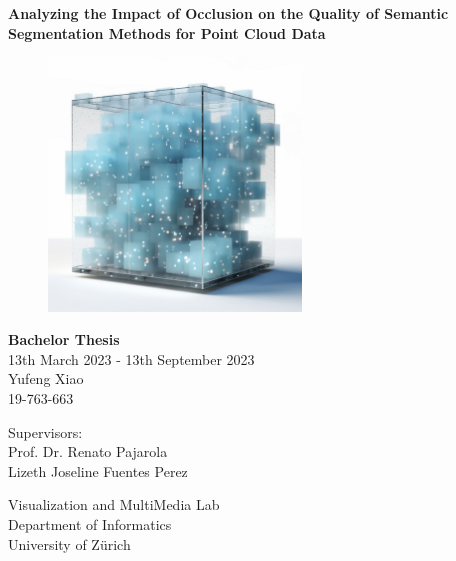 \documentclass[11pt, a4paper,oneside,chapterprefix=false]{scrbook}
\begin{document}
\frontmatter
\begin{titlepage}
	\setlength{\parindent}{0cm}
	\addtolength{\textheight}{1.0cm}

	\vspace{0.2cm}
	\Huge
	\begin{center}
		{\textsf{\textbf{Analyzing the Impact of Occlusion on the Quality of Semantic Segmentation Methods for Point Cloud Data}}}	
	\end{center}
	

	\vfill \vfill \vfill
	\begin{figure}[h]
		\centering
		\includegraphics*[width=0.6\textwidth]{figures/titleimage_yf.png}
	\end{figure}

	\vfill
	\sffamily\Large
	\begin{center}
		{\textbf{Bachelor Thesis}} \\ 
		13th March 2023 - 13th September 2023 \\[0.5cm]
		\large
		Yufeng Xiao \\ 19-763-663
	\end{center}

	\vfill \vfill \vfill
	\begin{minipage}[b]{0.5\textwidth} \raggedright
	Supervisors: \\
	Prof. Dr. Renato Pajarola \\
	Lizeth Joseline Fuentes Perez \\
	\end{minipage}
	\begin{minipage}[b]{0.5\textwidth} \raggedleft
	Visualization and MultiMedia Lab \\
	Department of Informatics \\
	University of Z{\"u}rich
	\end{minipage}


\end{titlepage}
\end{document}
